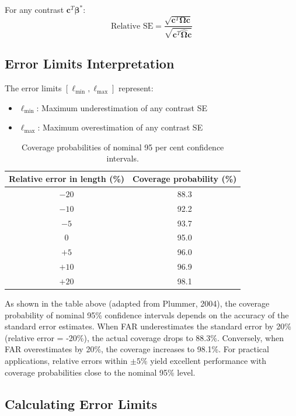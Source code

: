 \documentclass[11pt]{article}
\begin{document}
For any contrast $\mathbf{c}^T\boldsymbol{\beta}^*$:
\begin{equation}
    \text{Relative SE} = \frac{\sqrt{\mathbf{c}^T\boldsymbol{\Omega}\mathbf{c}}}{\sqrt{\mathbf{c}^T\hat{\boldsymbol{\Omega}}\mathbf{c}}}
\end{equation}

\subsection{Error Limits Interpretation}

The error limits $[\ell_{\min}, \ell_{\max}]$ represent:
\begin{itemize}
    \item $\ell_{\min}$: Maximum underestimation of any contrast SE
    \item $\ell_{\max}$: Maximum overestimation of any contrast SE
\end{itemize}

\begin{table}[h]
\centering
\caption{Coverage probabilities of nominal 95 per cent confidence intervals.}
\begin{tabular}{cc}
\hline
Relative error in length (\%) & Coverage probability (\%) \\
\hline
$-20$ & 88.3 \\
$-10$ & 92.2 \\
$-5$ & 93.7 \\
0 & 95.0 \\
$+5$ & 96.0 \\
$+10$ & 96.9 \\
$+20$ & 98.1 \\
\hline
\end{tabular}
\end{table}

As shown in the table above (adapted from Plummer, 2004), the coverage probability of nominal 95\% confidence intervals depends on the accuracy of the standard error estimates. When FAR underestimates the standard error by 20\% (relative error = -20\%), the actual coverage drops to 88.3\%. Conversely, when FAR overestimates by 20\%, the coverage increases to 98.1\%. For practical applications, relative errors within $\pm 5\%$ yield excellent performance with coverage probabilities close to the nominal 95\% level.

\subsection{Calculating Error Limits}
\end{document}
